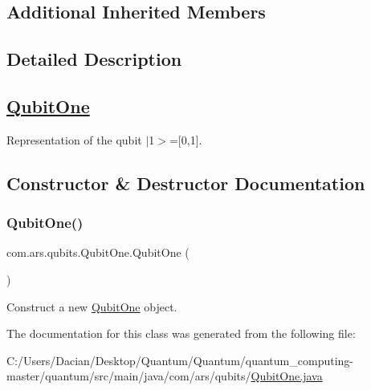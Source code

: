 \subsection*{Additional Inherited Members}


\subsection{Detailed Description}
\subsection*{\hyperlink{classcom_1_1ars_1_1qubits_1_1_qubit_one}{Qubit\+One}}

Representation of the qubit $\vert$1$>$=\mbox{[}0,1\mbox{]}. 

\subsection{Constructor \& Destructor Documentation}
\hypertarget{classcom_1_1ars_1_1qubits_1_1_qubit_one_a22be10817ff693defa00a6bc293cf322}{}\label{classcom_1_1ars_1_1qubits_1_1_qubit_one_a22be10817ff693defa00a6bc293cf322} 
\subsubsection{\texorpdfstring{Qubit\+One()}{QubitOne()}}
{\footnotesize\ttfamily com.\+ars.\+qubits.\+Qubit\+One.\+Qubit\+One (\begin{DoxyParamCaption}{ }\end{DoxyParamCaption})}

Construct a new {\ttfamily  \hyperlink{classcom_1_1ars_1_1qubits_1_1_qubit_one}{Qubit\+One}} object. 

The documentation for this class was generated from the following file\+:\begin{DoxyCompactItemize}
\item 
C\+:/\+Users/\+Dacian/\+Desktop/\+Quantum/\+Quantum/quantum\+\_\+computing-\/master/quantum/src/main/java/com/ars/qubits/\hyperlink{_qubit_one_8java}{Qubit\+One.\+java}\end{DoxyCompactItemize}
